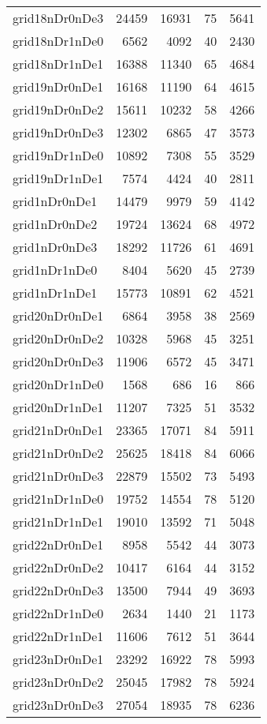 \begin{longtable}{lrrrr}
grid18nDr0nDe3 & 24459 & 16931 & 75 & 5641 \\
grid18nDr1nDe0 & 6562 & 4092 & 40 & 2430 \\
grid18nDr1nDe1 & 16388 & 11340 & 65 & 4684 \\
grid19nDr0nDe1 & 16168 & 11190 & 64 & 4615 \\
grid19nDr0nDe2 & 15611 & 10232 & 58 & 4266 \\
grid19nDr0nDe3 & 12302 & 6865 & 47 & 3573 \\
grid19nDr1nDe0 & 10892 & 7308 & 55 & 3529 \\
grid19nDr1nDe1 & 7574 & 4424 & 40 & 2811 \\
grid1nDr0nDe1 & 14479 & 9979 & 59 & 4142 \\
grid1nDr0nDe2 & 19724 & 13624 & 68 & 4972 \\
grid1nDr0nDe3 & 18292 & 11726 & 61 & 4691 \\
grid1nDr1nDe0 & 8404 & 5620 & 45 & 2739 \\
grid1nDr1nDe1 & 15773 & 10891 & 62 & 4521 \\
grid20nDr0nDe1 & 6864 & 3958 & 38 & 2569 \\
grid20nDr0nDe2 & 10328 & 5968 & 45 & 3251 \\
grid20nDr0nDe3 & 11906 & 6572 & 45 & 3471 \\
grid20nDr1nDe0 & 1568 & 686 & 16 & 866 \\
grid20nDr1nDe1 & 11207 & 7325 & 51 & 3532 \\
grid21nDr0nDe1 & 23365 & 17071 & 84 & 5911 \\
grid21nDr0nDe2 & 25625 & 18418 & 84 & 6066 \\
grid21nDr0nDe3 & 22879 & 15502 & 73 & 5493 \\
grid21nDr1nDe0 & 19752 & 14554 & 78 & 5120 \\
grid21nDr1nDe1 & 19010 & 13592 & 71 & 5048 \\
grid22nDr0nDe1 & 8958 & 5542 & 44 & 3073 \\
grid22nDr0nDe2 & 10417 & 6164 & 44 & 3152 \\
grid22nDr0nDe3 & 13500 & 7944 & 49 & 3693 \\
grid22nDr1nDe0 & 2634 & 1440 & 21 & 1173 \\
grid22nDr1nDe1 & 11606 & 7612 & 51 & 3644 \\
grid23nDr0nDe1 & 23292 & 16922 & 78 & 5993 \\
grid23nDr0nDe2 & 25045 & 17982 & 78 & 5924 \\
grid23nDr0nDe3 & 27054 & 18935 & 78 & 6236 \\

\end{longtable}
